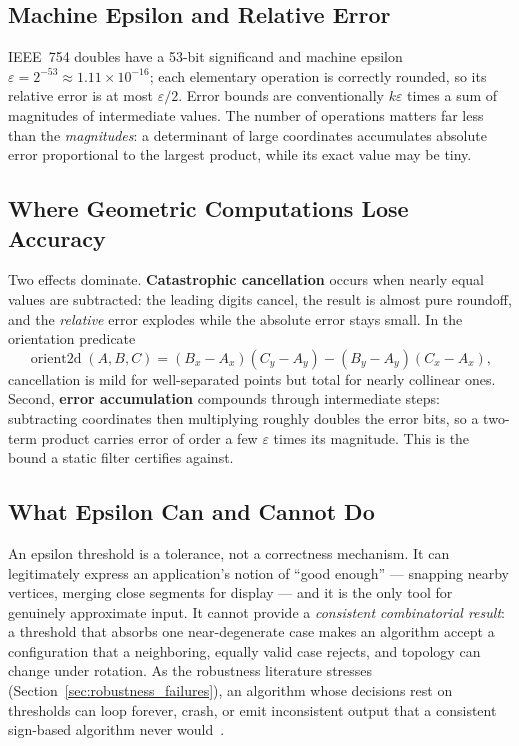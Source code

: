 \subsection{Machine Epsilon and Relative Error}
\label{sec:appimpl_machine_eps}
IEEE~754 doubles have a 53-bit significand and machine epsilon
$\varepsilon = 2^{-53} \approx 1.11\times 10^{-16}$; each elementary
operation is correctly rounded, so its relative error is at most
$\varepsilon/2$. Error bounds are conventionally $k\varepsilon$ times a sum
of magnitudes of intermediate values. The number of operations matters far
less than the \emph{magnitudes}: a determinant of large coordinates
accumulates absolute error proportional to the largest product, while its
exact value may be tiny.
\subsection{Where Geometric Computations Lose Accuracy}
\label{sec:appimpl_loss_accuracy}
Two effects dominate. \textbf{Catastrophic
cancellation} occurs when nearly equal values are subtracted: the leading
digits cancel, the result is almost pure roundoff, and the \emph{relative}
error explodes while the absolute error stays small. In the orientation
predicate
\[
  \operatorname{orient2d}(A,B,C) =
  (B_x-A_x)(C_y-A_y) - (B_y-A_y)(C_x-A_x),
\]
cancellation is mild for well-separated points but total for nearly
collinear ones. Second, \textbf{error accumulation} compounds through
intermediate steps: subtracting coordinates then multiplying roughly doubles
the error bits, so a two-term product carries error of order a few
$\varepsilon$ times its magnitude. This is the bound a static filter
certifies against.
\subsection{What Epsilon Can and Cannot Do}
\label{sec:appimpl_epsilon}
An epsilon threshold is a tolerance, not a correctness mechanism. It can
legitimately express an application's notion of ``good enough'' --- snapping
nearby vertices, merging close segments for display --- and it is the only
tool for genuinely approximate input. It cannot provide a \emph{consistent
combinatorial result}: a threshold that absorbs one near-degenerate case
makes an algorithm accept a configuration that a neighboring, equally valid
case rejects, and topology can change under rotation. As the robustness
literature stresses (Section~\ref{sec:robustness_failures}), an algorithm
whose decisions rest on thresholds can loop forever, crash, or emit
inconsistent output that a consistent sign-based algorithm never
would~\cite{kettner2008}.

